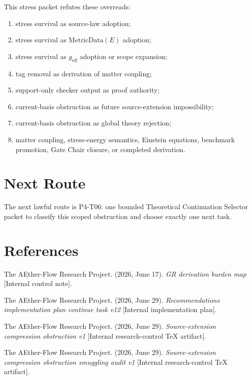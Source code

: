 \documentclass[11pt]{article}
\newcommand{\MetricData}{\mathrm{MetricData}}
\newcommand{\geff}{g_{\mathrm{eff}}}
\begin{document}
This stress packet refutes these overreads:
\begin{enumerate}[leftmargin=*]
  \item stress survival as source-law adoption;
  \item stress survival as \(\MetricData(E)\) adoption;
  \item stress survival as \(\geff\) adoption or scope expansion;
  \item tag removal as derivation of matter coupling;
  \item support-only checker output as proof authority;
  \item current-basis obstruction as future source-extension impossibility;
  \item current-basis obstruction as global theory rejection;
  \item matter coupling, stress-energy semantics, Einstein equations,
  benchmark promotion, Gate Chair closure, or completed derivation.
\end{enumerate}

\section{Next Route}

The next lawful route is P4-T06: one bounded Theoretical Continuation Selector
packet to classify this scoped obstruction and choose exactly one next task.

\section{References}

The AEther-Flow Research Project. (2026, June 17). \emph{GR derivation burden
map} [Internal control note].

The AEther-Flow Research Project. (2026, June 29). \emph{Recommendations
implementation plan continue task v12} [Internal implementation plan].

The AEther-Flow Research Project. (2026, June 29). \emph{Source-extension
compression obstruction v1} [Internal research-control TeX artifact].

The AEther-Flow Research Project. (2026, June 29). \emph{Source-extension
compression obstruction smuggling audit v1} [Internal research-control TeX
artifact].
\end{document}
